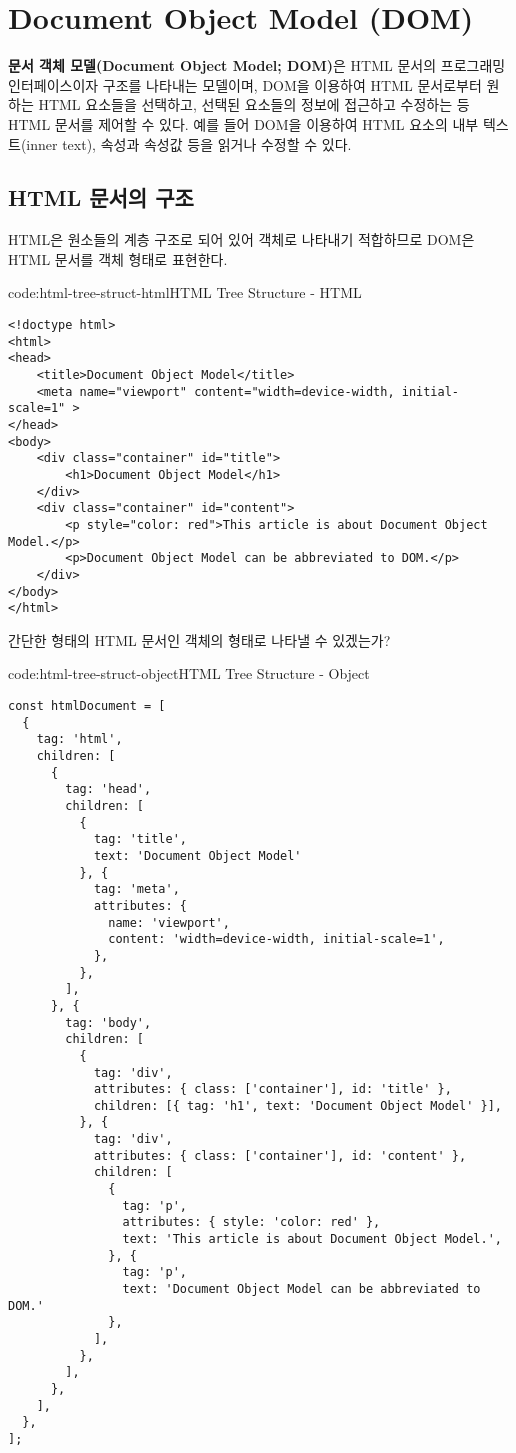 \section{Document Object Model (DOM)} \label{sect:document-object-model}

\textbf{문서 객체 모델(Document Object Model; DOM)}은 HTML 문서의 프로그래밍 인터페이스이자 구조를 나타내는 모델이며, DOM을 이용하여 HTML 문서로부터 원하는 HTML 요소들을 선택하고, 선택된 요소들의 정보에 접근하고 수정하는 등 HTML 문서를 제어할 수 있다. 예를 들어 DOM을 이용하여 HTML 요소의 내부 텍스트(inner text), 속성과 속성값 등을 읽거나 수정할 수 있다.

\subsection*{HTML 문서의 구조}

HTML은 원소들의 계층 구조로 되어 있어 객체로 나타내기 적합하므로 DOM은 HTML 문서를 객체 형태로 표현한다.

\begin{codeenv}{code:html-tree-struct-html}{HTML Tree Structure - HTML}\begin{verbatim}
<!doctype html>
<html>
<head>
    <title>Document Object Model</title>
    <meta name="viewport" content="width=device-width, initial-scale=1" >
</head>
<body>
    <div class="container" id="title">
        <h1>Document Object Model</h1>
    </div>
    <div class="container" id="content">
        <p style="color: red">This article is about Document Object Model.</p>
        <p>Document Object Model can be abbreviated to DOM.</p>
    </div>
</body>
</html>
\end{verbatim}
\end{codeenv}

간단한 형태의 HTML 문서인 \을 객체의 형태로 나타낼 수 있겠는가?

\begin{codeenv}{code:html-tree-struct-object}{HTML Tree Structure - Object}\begin{verbatim}
const htmlDocument = [
  {
    tag: 'html',
    children: [
      {
        tag: 'head',
        children: [
          {
            tag: 'title',
            text: 'Document Object Model'
          }, {
            tag: 'meta',
            attributes: {
              name: 'viewport',
              content: 'width=device-width, initial-scale=1',
            },
          },
        ],
      }, {
        tag: 'body',
        children: [
          {
            tag: 'div',
            attributes: { class: ['container'], id: 'title' },
            children: [{ tag: 'h1', text: 'Document Object Model' }],
          }, {
            tag: 'div',
            attributes: { class: ['container'], id: 'content' },
            children: [
              {
                tag: 'p',
                attributes: { style: 'color: red' },
                text: 'This article is about Document Object Model.',
              }, {
                tag: 'p',
                text: 'Document Object Model can be abbreviated to DOM.'
              },
            ],
          },
        ],
      },
    ],
  },
];
\end{verbatim}
\end{codeenv}

